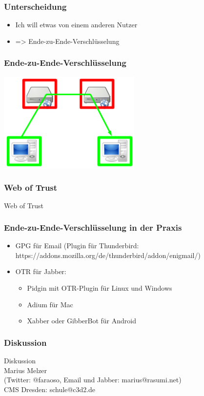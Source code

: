 \documentclass[12pt]{beamer}
\begin{document}
\begin{frame}
    \frametitle{Unterscheidung}
    \begin{itemize}
      \item<2-> Ich will etwas von einem anderen Nutzer
      \item<3-> => Ende-zu-Ende-Verschlüsselung
    \end{itemize}
\end{frame}

\begin{frame}
    \frametitle{Ende-zu-Ende-Verschlüsselung}
    \begin{center}
      \includegraphics[height=5cm]{img/fed-end-to-end.png}
    \end{center}
\end{frame}

\begin{frame}
    \frametitle{Web of Trust}
    \begin{center}\Large
      Web of Trust
    \end{center}
\end{frame}

\begin{frame}
    \frametitle{Ende-zu-Ende-Verschlüsselung in der Praxis}
    \begin{itemize}
      \item<2-> GPG für Email (Plugin für Thunderbird: https://addons.mozilla.org/de/thunderbird/addon/enigmail/)
      \item<3-> OTR für Jabber:
        \begin{itemize}
          \item Pidgin mit OTR-Plugin für Linux und Windows
          \item Adium für Mac
          \item Xabber oder GibberBot für Android
        \end{itemize}
    \end{itemize}
\end{frame}

\begin{frame}
  \frametitle{Diskussion}
  \begin{center}
    {\Large Diskussion}\\Marius Melzer \\(Twitter: @faraoso, Email und Jabber: marius@rasumi.net)\\CMS Dresden: schule@c3d2.de
  \end{center}
\end{frame}
\end{document}

